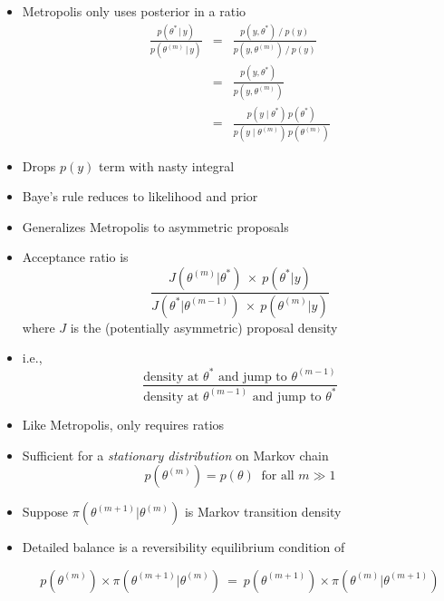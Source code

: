 \documentclass[10pt]{report}
\begin{document}
%
\begin{itemize}
\item Metropolis only uses posterior in a ratio
\begin{eqnarray*}
\frac{p(\theta^{*} \, | \, y)}
     {p(\theta^{(m)} \, | \, y)}
& = &
\frac{p(y, \theta^*) \ / \ p(y)}
     {p(y, \theta^{(m)}) \ / \ p(y)}
\\[8pt]
& = &
\frac{p(y, \theta^*)}
     {p(y, \theta^{(m)})}
\\[8pt]
& = &
\frac{p(y \mid \theta^*) \, p(\theta^*)}
     {p(y \mid \theta^{(m)}) \, p(\theta^{(m)})}
\end{eqnarray*}
\item Drops $p(y)$ term with nasty integral
\item Baye's rule reduces to likelihood and prior
\end{itemize}


%
\begin{itemize}
\item Generalizes Metropolis to asymmetric proposals
\item Acceptance ratio is
\[
\frac{J(\theta^{(m)}|\theta^{*}) \ \times \ p(\theta^{*}|y)}
     {J(\theta^{*}|\theta^{(m-1)}) \ \times \ p(\theta^{(m)}|y)}
\]
where $J$ is the (potentially asymmetric) proposal density
\item i.e.,
{\small
\[
\frac{\mbox{density at } \theta^*
      \mbox{ and jump to } \theta^{(m-1)}}
     {\mbox{density at } \theta^{(m-1)}
      \mbox{ and jump to } \theta^{*}}
\]
}
\vspace*{3pt}
\item Like Metropolis, only requires ratios
\end{itemize}


%
\begin{itemize}
\item Sufficient for a \emph{stationary distribution} on Markov chain
\[
p(\theta^{(m)}) = p(\theta) \ \mbox{ for all } m \gg 1
\]
\item Suppose $\pi(\theta^{(m+1)} | \theta^{(m)})$ is Markov transition density
\item Detailed balance is a reversibility equilibrium condition of
\[
p(\theta^{(m)}) \times \pi(\theta^{(m+1)} | \theta^{(m)})
\ = \
p(\theta^{(m+1)}) \times \pi(\theta^{(m)} | \theta^{(m+1)})
\]

\end{itemize}
\end{document}
